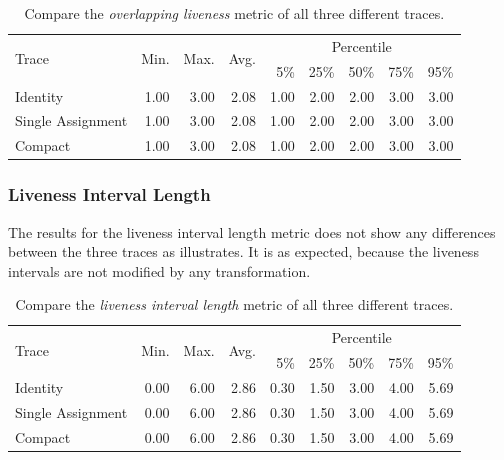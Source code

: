 \documentclass[onecolumn, openright, master, english, signatures]{dbrgrptt}
\begin{document}
\begin{table}[!ht]
  \centering
  \begin{tabular}{lrrrrrrrr}
    \hline
    \multirow{2}{*}{Trace} & \multirow{2}{*}{Min.} & \multirow{2}{*}{Max.} & \multirow{2}{*}{Avg.} & \multicolumn{5}{c}{Percentile} \tabularnewline
    & & & & 5\% & 25\% & 50\% & 75\% & 95\% \tabularnewline
    \hline
    Identity          & 1.00 & 3.00 & 2.08 & 1.00 & 2.00 & 2.00 & 3.00 & 3.00 \\
    Single Assignment & 1.00 & 3.00 & 2.08 & 1.00 & 2.00 & 2.00 & 3.00 & 3.00 \\
    Compact           & 1.00 & 3.00 & 2.08 & 1.00 & 2.00 & 2.00 & 3.00 & 3.00 \\
    \hline
  \end{tabular}
  \caption{Compare the \emph{overlapping liveness} metric of all three different \ac{trace}s.}
  \label{tab:summarizing-example-metrics-overview-concurrently-live}
\end{table}

\subsubsection{Liveness Interval Length}
The results for the liveness interval length metric does not show any differences between the three \ac{trace}s as  illustrates.
It is as expected, because the liveness intervals are not modified by any transformation.

\begin{table}[!ht]
  \centering
  \begin{tabular}{lrrrrrrrr}
    \hline
    \multirow{2}{*}{Trace} & \multirow{2}{*}{Min.} & \multirow{2}{*}{Max.} & \multirow{2}{*}{Avg.} & \multicolumn{5}{c}{Percentile} \tabularnewline
    & & & & 5\% & 25\% & 50\% & 75\% & 95\% \tabularnewline
    \hline
    Identity          & 0.00 & 6.00 & 2.86 & 0.30 & 1.50 & 3.00 & 4.00 & 5.69 \\
    Single Assignment & 0.00 & 6.00 & 2.86 & 0.30 & 1.50 & 3.00 & 4.00 & 5.69 \\
    Compact           & 0.00 & 6.00 & 2.86 & 0.30 & 1.50 & 3.00 & 4.00 & 5.69 \\
    \hline
  \end{tabular}
  \caption{Compare the \emph{liveness interval length} metric of all three different \ac{trace}s.}
  \label{tab:summarizing-example-metrics-overview-liveness-interval-length}
\end{table}
\end{document}
